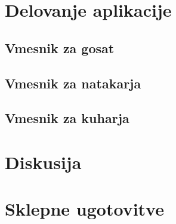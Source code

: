 \documentclass[a4paper, 12pt]{book}
\begin{document}
\chapter {Delovanje aplikacije}
\section{Vmesnik za gosat}
\section{Vmesnik za natakarja}
\section{Vmesnik za kuharja}

\chapter {Diskusija}

\chapter {Sklepne ugotovitve}
\newpage %
\ \\
\clearpage
{}


\end{document}
